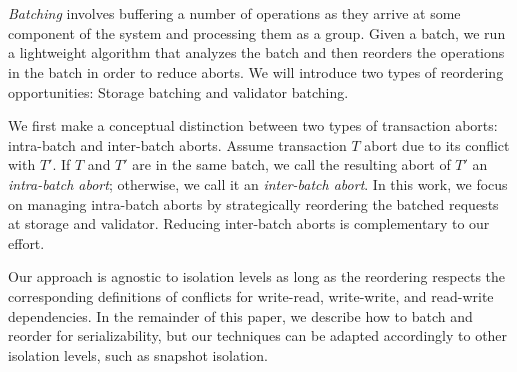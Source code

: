 \section{}\label{sec:overview}


\emph{Batching} involves buffering a number of operations as they arrive at some component of the system and processing them as a group. 
Given a batch, we run a lightweight algorithm that analyzes the batch and then reorders the operations in the batch in order to reduce aborts. We will introduce two types of reordering opportunities: Storage batching and validator batching.

We first make a conceptual distinction between two types of transaction aborts: intra-batch and inter-batch aborts. Assume transaction $T$ abort due to its conflict with $T'$. If $T$ and $T'$ are in the same batch, we call the resulting abort of $T'$ an \emph{intra-batch abort}; otherwise, we call it an \emph{inter-batch abort}.
In this work, we focus on managing intra-batch aborts by strategically reordering the batched requests at storage and validator. 
Reducing inter-batch aborts is complementary to our effort. 

Our approach is agnostic to isolation levels as long as the reordering respects the corresponding definitions of conflicts for 
write-read, write-write, and read-write dependencies. In the remainder of this paper, we describe 
how to batch and reorder for serializability, but our techniques can be adapted accordingly to other isolation levels, 
such as snapshot isolation.


